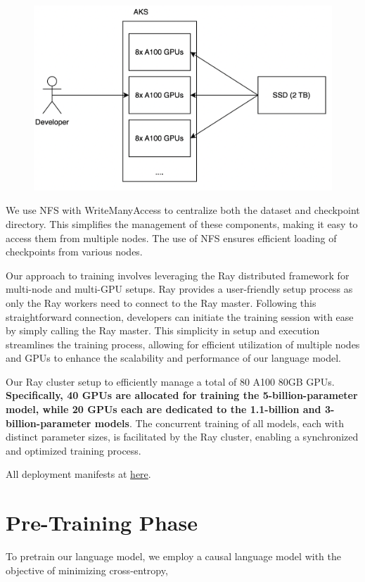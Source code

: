 \documentclass{article}
\begin{document}
\begin{figure}[h]
  \centering
  \includegraphics[width=0.6\linewidth]{pic/aks-gpu.png} %
\end{figure}

We use NFS with WriteManyAccess to centralize both the dataset and checkpoint directory. This simplifies the management of these components, making it easy to access them from multiple nodes. The use of NFS ensures efficient loading of checkpoints from various nodes.

Our approach to training involves leveraging the Ray distributed framework \cite{moritz2018ray} for multi-node and multi-GPU setups. Ray provides a user-friendly setup process as only the Ray workers need to connect to the Ray master. Following this straightforward connection, developers can initiate the training session with ease by simply calling the Ray master. This simplicity in setup and execution streamlines the training process, allowing for efficient utilization of multiple nodes and GPUs to enhance the scalability and performance of our language model.

Our Ray cluster setup to efficiently manage a total of 80 A100 80GB GPUs. \textbf{Specifically, 40 GPUs are allocated for training the 5-billion-parameter model, while 20 GPUs each are dedicated to the 1.1-billion and 3-billion-parameter models}. The concurrent training of all models, each with distinct parameter sizes, is facilitated by the Ray cluster, enabling a synchronized and optimized training process.

All deployment manifests at \href{https://github.com/mesolitica/malaya/wiki/MaLLaM-%F0%9F%8C%99-Malaysia-Large-Language-Model#how-about-the-cluster-deployments}{here}.

\section{Pre-Training Phase}\label{sec:4096-pretrained}

To pretrain our language model, we employ a causal language model with the objective of minimizing cross-entropy,
\end{document}
